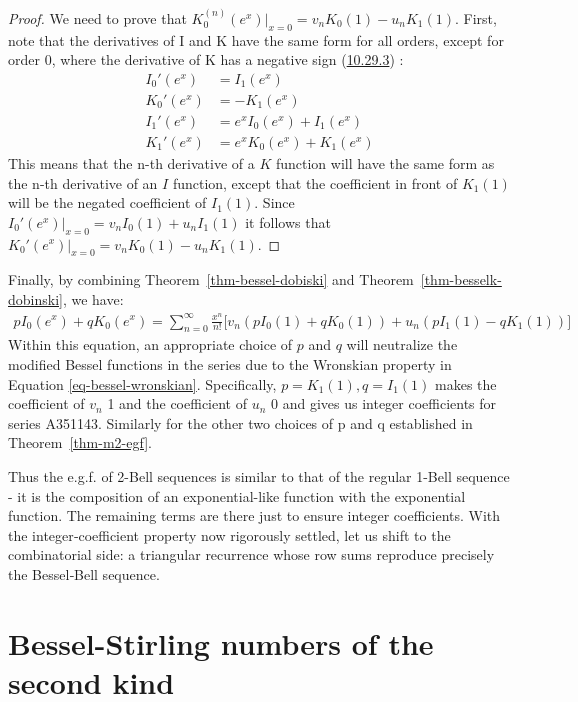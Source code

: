 \documentclass[a4paper]{amsart}
\begin{document}
\begin{proof}
We need to prove that $K_0^{(n)}(e^x)|_{x=0} = v_n K_0(1)-u_n K_1(1)$. First, note that the derivatives of I and K have the same form for all orders, except for order 0, where the derivative of K has a negative sign (\href{https://dlmf.nist.gov/10.29.E3}{10.29.3}) \cite{NIST:DLMF}:
\[
\begin{aligned}
I_0'(e^x) &= I_1(e^x) \\
K_0'(e^x) &= -K_1(e^x) \\
I_1'(e^x) &= e^x I_0(e^x) + I_1(e^x) \\
K_1'(e^x) &= e^x K_0(e^x) + K_1(e^x)
\end{aligned}
\]
This means that the n-th derivative of a $K$ function will have the same form as the n-th derivative of an $I$ function, except that the coefficient in front of $K_1(1)$ will be the negated coefficient of $I_1(1)$. Since $I_0'(e^x)|_{x=0} = v_n I_0(1) + u_n I_1(1)$ it follows that $K_0'(e^x)|_{x=0} = v_n K_0(1)-u_n K_1(1)$.
\end{proof}

Finally, by combining Theorem~\ref{thm-bessel-dobiski} and Theorem~\ref{thm-besselk-dobinski}, we have:
\[
\begin{aligned}
p I_0(e^x) + q K_0(e^x) = \sum_{n=0}^\infty \frac{x^n}{n!} \bigg[ v_n (p I_0(1) + q K_0(1)) + u_n (p I_1(1) - q K_1(1))\bigg]
\end{aligned}
\]
Within this equation, an appropriate choice of $p$ and $q$ will neutralize the modified Bessel functions in the series due to the Wronskian property in Equation \eqref{eq-bessel-wronskian}. Specifically, $p = K_1(1), q = I_1(1)$ makes the coefficient of $v_n$ 1 and the coefficient of $u_n$ 0 and gives us integer coefficients for series A351143. Similarly for the other two choices of p and q established in Theorem~\ref{thm-m2-egf}.

Thus the e.g.f. of 2-Bell sequences is similar to that of the regular 1-Bell sequence - it is the composition of an exponential-like function with the exponential function. The remaining terms are there just to ensure integer coefficients. With the integer‑coefficient property now rigorously settled, let us shift to the combinatorial side: a triangular recurrence whose row sums reproduce precisely the Bessel‑Bell sequence.

\section{Bessel-Stirling numbers of the second kind}\label{sec-2-stirling}
\end{document}
